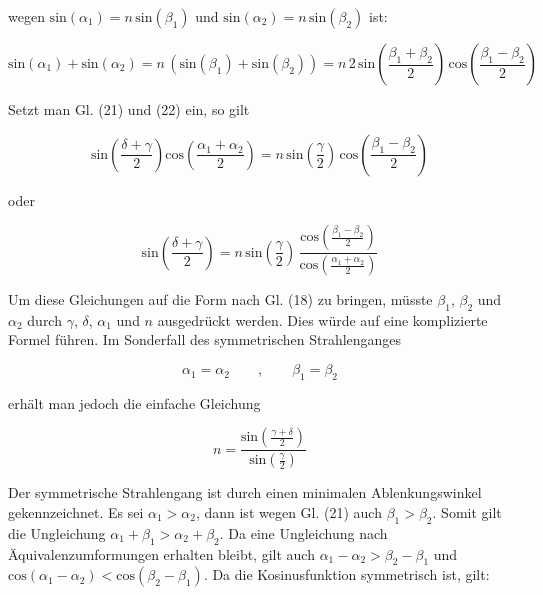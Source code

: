 \documentclass[11pt,ngerman]{scrartcl}
\begin{document}
wegen $\textrm{sin}(\alpha_1) = n \,\textrm{sin}(\beta_1)$ und $\textrm{sin}(\alpha_2) = n \,\textrm{sin}(\beta_2)$ ist:

\begin{equation}
	\textrm{sin}(\alpha_1) + \textrm{sin}(\alpha_2) = n\,(\textrm{sin}(\beta_1) + \textrm{sin}(\beta_2)) = n\,2\, \textrm{sin}\left(\frac{\beta_1 + \beta_2}{2}\right) \,\textrm{cos}\left(\frac{\beta_1 - \beta_2}{2}\right)
\end{equation}

Setzt man Gl. (21) und (22) ein, so gilt

\begin{equation}
	\textrm{sin}\left(\frac{\delta + \gamma}{2}\right) \textrm{cos}\left(\frac{\alpha_1 + \alpha_2}{2}\right) = n\, \textrm{sin}\left(\frac{\gamma}{2}\right) \,\textrm{cos}\left(\frac{\beta_1 - \beta_2}{2}\right)
\end{equation}

oder

\begin{equation}
	\textrm{sin}\left(\frac{\delta + \gamma}{2}\right) = n\, \textrm{sin}\left(\frac{\gamma}{2}\right) \,\frac{\textrm{cos}(\frac{\beta_1 - \beta_2}{2})}{\textrm{cos}(\frac{\alpha_1 + \alpha_2}{2})}
\end{equation}

Um diese Gleichungen auf die Form nach Gl. (18) zu bringen, müsste $\beta_1$, $\beta_2$ und $\alpha_2$ durch $\gamma$, $\delta$,
$\alpha_1$ und $n$ ausgedrückt werden. Dies würde auf eine komplizierte Formel führen. Im Sonderfall
des symmetrischen Strahlenganges

\begin{equation}
	\alpha_1 = \alpha_2 \qquad , \qquad \beta_1 = \beta_2
\end{equation}

erhält man jedoch die einfache Gleichung

\begin{equation}
	n = \frac{\textrm{sin}(\frac{\gamma + \delta}{2})}{\textrm{sin}(\frac{\gamma}{2})}
	\label{eq:brechzahl}
\end{equation}

Der symmetrische Strahlengang ist durch einen minimalen Ablenkungswinkel gekennzeichnet. Es
sei $\alpha_1 > \alpha_2$, dann ist wegen Gl. (21) auch $\beta_1 > \beta_2$. Somit gilt die Ungleichung $\alpha_1 +\beta_1 > \alpha_2 + \beta_2$.
Da eine Ungleichung nach Äquivalenzumformungen erhalten bleibt, gilt auch $\alpha_1 -\alpha_2 > \beta_2 - \beta_1$
und $\textrm{cos}(\alpha_1 -\alpha_2) < \textrm{cos}(\beta_2 - \beta_1)$. Da die Kosinusfunktion symmetrisch ist, gilt:
\end{document}
